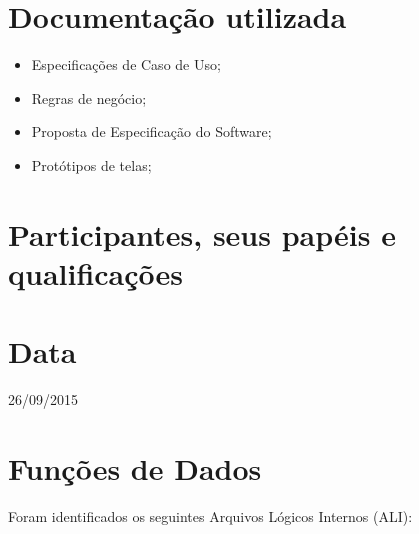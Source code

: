 \section{Documentação utilizada}

\begin{itemize}
 \item Especificações de Caso de Uso;
 \item Regras de negócio;
 \item Proposta de Especificação do Software;
 \item Protótipos de telas;
\end{itemize}

\section{Participantes, seus papéis e qualificações}

\section{Data}
26/09/2015

\section{Funções de Dados}

Foram identificados os seguintes Arquivos Lógicos Internos (ALI):

